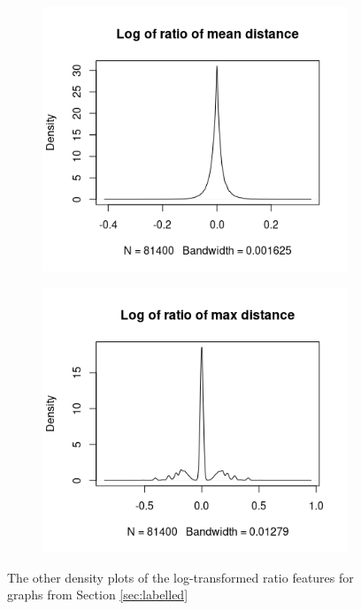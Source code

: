 \documentclass{l4proj}
\theoremstyle{definition}
\theoremstyle{remark}
\begin{document}
\begin{figure}
\begin{subfigure}[t]{0.49\textwidth}
    \centering
    \includegraphics[width=\textwidth]{images/mcs_ratio_meandist.png}
  \end{subfigure}
  \begin{subfigure}[t]{0.49\textwidth}
    \centering
    \includegraphics[width=\textwidth]{images/mcs_ratio_maxdist.png}
  \end{subfigure}
  \caption{The other density plots of the log-transformed ratio features for
    graphs from Section \ref{sec:labelled}}
  \label{fig:mcs_ratio}
\end{figure}
\end{document}

